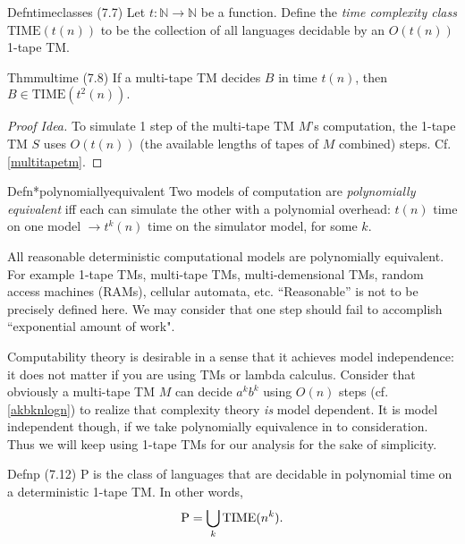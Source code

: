 \begin{reference}{Defn}{timeclasses}
  (7.7) Let $t:\mathbb{N}\to \mathbb{N}$ be a function. Define the \emph{time complexity class} $\mathrm{TIME}(t(n))$ to be the collection of all languages decidable by an $O(t(n))$ 1-tape TM.
\end{reference}

\begin{reference}{Thm}{multime}
  (7.8) If a multi-tape TM decides $B$ in time $t(n)$, then $B\in \mathrm{TIME}(t^2(n)).$
\end{reference}

\begin{proof}[Proof Idea]
  To simulate 1 step of the multi-tape TM $M$'s computation, the 1-tape TM $S$ uses $O(t(n))$ (the available lengths of tapes of $M$ combined) steps. Cf. \ref{multitapetm}.
\end{proof}

\begin{reference}{Defn*}{polynomiallyequivalent}
  Two models of computation are \emph{polynomially equivalent} iff each can simulate the other with a polynomial overhead: $t(n)$ time on one model $\to t^k(n)$ time on the simulator model, for some $k$.
\end{reference}

All reasonable deterministic computational models are polynomially equivalent. For example 1-tape TMs, multi-tape TMs, multi-demensional TMs, random access machines (RAMs), cellular automata, etc. ``Reasonable'' is not to be precisely defined here. We may consider that one step should fail to accomplish ``exponential amount of work".

Computability theory is desirable in a sense that it achieves model independence: it does not matter if you are using TMs or lambda calculus. Consider that obviously a multi-tape TM $M$ can decide $a^kb^k$ using $O(n)$ steps (cf. \ref{akbknlogn}) to realize that complexity theory \textit{is} model dependent. It is model independent though, if we take polynomially equivalence in to consideration. Thus we will keep using 1-tape TMs for our analysis for the sake of simplicity.

\begin{reference}{Defn}{p}
  (7.12) $\mathrm{P}$ is the class of languages that are decidable in polynomial time on a deterministic 1-tape TM. In other words,
  \[
    \mathrm{P}=\bigcup_k \mathrm{TIME}(n^k).\qedhere
  \]
\end{reference}

